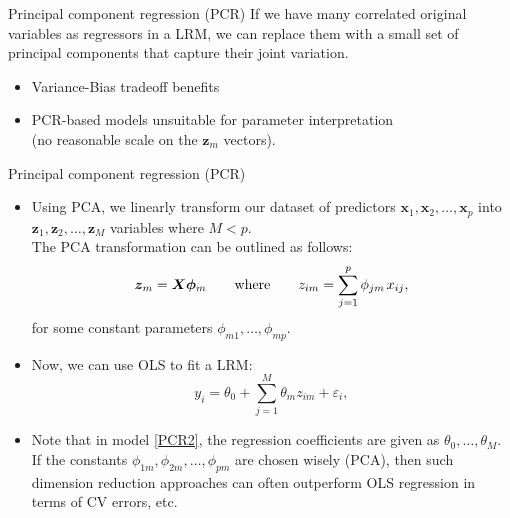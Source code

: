 \documentclass{beamer}
\begin{document}
\begin{frame}{Principal component regression (PCR)}
\bigskip
If we have many correlated original variables as regressors in a LRM, we can replace them with a small set of principal components that capture their joint variation.
\medskip
\begin{itemize}
\item[\ding{51}] Variance-Bias tradeoff benefits
\medskip
\item[\ding{55}] PCR-based models unsuitable for parameter interpretation\\ (no reasonable scale on the $\bm{z}_m$ vectors).
\end{itemize}
\end{frame}
\begin{frame}{Principal component regression (PCR)}
\begin{itemize}
\item Using PCA, we linearly transform our dataset of predictors $\bm{x}_1, \bm{x}_2, \dots, \bm{x}_p$ into $\bm{z}_1, \bm{z}_2, \dots, \bm{z}_M$ variables where $M < p$. \\The PCA transformation can be outlined as follows: 
\begin{equation} \label{PCR1}
\bm{z}_m = \bm{X\phi}_m \qquad \textnormal{where} \qquad z_{im} = \sum_{j=1}^p \phi_{jm\,} x_{ij},
\end{equation}
for some constant parameters $\phi_{m1}, \dots, \phi_{mp}$.
\item Now, we can use OLS to fit a LRM:
\begin{equation} \label{PCR2}
y_i = \theta_0 + \sum_{j=1}^M \theta_m z_{im} + \varepsilon_i,
\end{equation}
\item Note that in model \eqref{PCR2}, the regression coefficients are given
as $\theta_0, \dots, \theta_M$. If the constants $\phi_{1m}, \phi_{2m}, \dots , \phi_{pm}$ are chosen wisely (PCA), then such dimension reduction approaches can often
outperform OLS regression in terms of CV errors, etc.
\end{itemize}
\end{frame}
\end{document}
